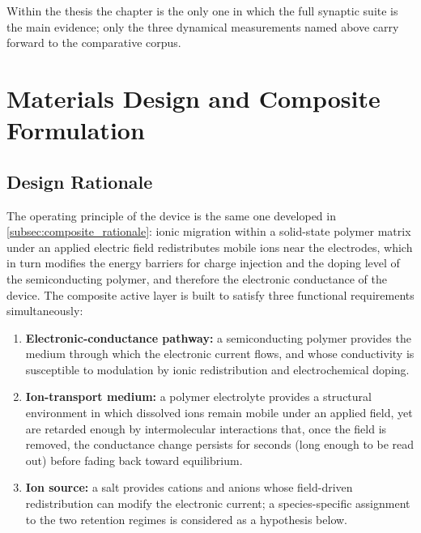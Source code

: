 \documentclass[12pt, twoside]{report}
\begin{document}
Within the thesis the chapter is the only one in which the full synaptic suite is the main evidence; only the three dynamical measurements named above carry forward to the comparative corpus.


\section{Materials Design and Composite Formulation}\label{sec:materials_design}

\subsection{Design Rationale}\label{subsec:design_rationale}

The operating principle of the device is the same one developed in \cref{subsec:composite_rationale}: ionic migration within a solid-state polymer matrix under an applied electric field redistributes mobile ions near the electrodes, which in turn modifies the energy barriers for charge injection and the doping level of the semiconducting polymer, and therefore the electronic conductance of the device. The composite active layer is built to satisfy three functional requirements simultaneously:

\begin{enumerate}
  \item \textbf{Electronic-conductance pathway:} a semiconducting polymer provides the medium through which the electronic current flows, and whose conductivity is susceptible to modulation by ionic redistribution and electrochemical doping.
  \item \textbf{Ion-transport medium:} a polymer electrolyte provides a structural environment in which dissolved ions remain mobile under an applied field, yet are retarded enough by intermolecular interactions that, once the field is removed, the conductance change persists for seconds (long enough to be read out) before fading back toward equilibrium.
  \item \textbf{Ion source:} a salt provides cations and anions whose field-driven redistribution can modify the electronic current; a species-specific assignment to the two retention regimes is considered as a hypothesis below.
\end{enumerate}
\end{document}
